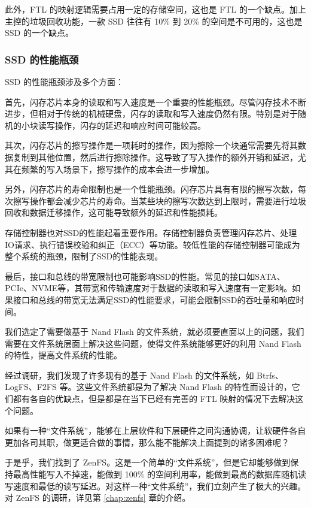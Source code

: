 此外，FTL 的映射逻辑需要占用一定的存储空间，这也是 FTL 的一个缺点。加上主控的垃圾回收功能，一款 SSD 往往有 10\% 到 20\% 的空间是不可用的，这也是 SSD 的一个缺点。

\subsubsection{SSD 的性能瓶颈}

SSD 的性能瓶颈涉及多个方面：

首先，闪存芯片本身的读取和写入速度是一个重要的性能瓶颈。尽管闪存技术不断进步，但相对于传统的机械硬盘，闪存的读取和写入速度仍然有限。特别是对于随机的小块读写操作，闪存的延迟和响应时间可能较高。

其次，闪存芯片的擦写操作是一项耗时的操作，因为擦除一个块通常需要先将其数据复制到其他位置，然后进行擦除操作。这导致了写入操作的额外开销和延迟，尤其在频繁的写入场景下，擦写操作的成本会进一步增加。

另外，闪存芯片的寿命限制也是一个性能瓶颈。闪存芯片具有有限的擦写次数，每次擦写操作都会减少芯片的寿命。当某些块的擦写次数达到上限时，需要进行垃圾回收和数据迁移操作，这可能导致额外的延迟和性能损耗。

存储控制器也对SSD的性能起着重要作用。存储控制器负责管理闪存芯片、处理IO请求、执行错误校验和纠正（ECC）等功能。较低性能的存储控制器可能成为整个系统的瓶颈，限制了SSD的性能表现。

最后，接口和总线的带宽限制也可能影响SSD的性能。常见的接口如SATA、PCIe、NVME等，其带宽和传输速度对于数据的读取和写入速度有一定影响。如果接口和总线的带宽无法满足SSD的性能要求，可能会限制SSD的吞吐量和响应时间。

我们选定了需要做基于 Nand Flash 的文件系统，就必须要直面以上的问题，我们需要在文件系统层面上解决这些问题，使得文件系统能够更好的利用 Nand Flash 的特性，提高文件系统的性能。

经过调研，我们发现了许多现有的基于 Nand Flash 的文件系统，如 Btrfs、LogFS、F2FS 等。这些文件系统都是为了解决 Nand Flash 的特性而设计的，它们都有各自的优缺点，但是都是在当下已经有完善的 FTL 映射的情况下去解决这个问题。

如果有一种“文件系统”，能够在上层软件和下层硬件之间沟通协调，让软硬件各自更加各司其职，做更适合做的事情，那么能不能解决上面提到的诸多困难呢？

于是乎，我们找到了 ZenFS。这是一个简单的“文件系统”，但是它却能够做到保持最高性能写入不掉速，能做到 100\% 的空间利用率，能做到最高的数据库随机读写速度和最低的读写延迟。对这样一种“文件系统”，我们立刻产生了极大的兴趣。对 ZenFS 的调研，详见第 \ref{chap:zenfs} 章的介绍。

